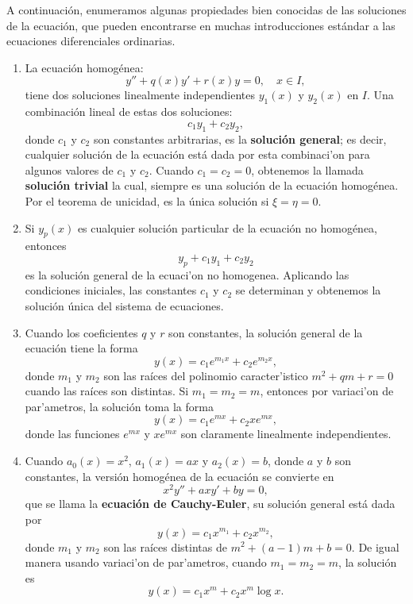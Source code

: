 \documentclass[main.tex]{subfiles}
\begin{document}
A continuación, enumeramos algunas propiedades bien conocidas de las soluciones de la ecuación, que pueden encontrarse en muchas introducciones estándar a las ecuaciones diferenciales ordinarias.

\begin{enumerate}
    \item La ecuación homogénea:
    \[
    y'' + q(x) y' + r(x) y = 0, \quad x \in I,
    \]
    tiene dos soluciones linealmente independientes \( y_1(x) \) y \( y_2(x) \) en \( I \). Una combinación lineal de estas dos soluciones:
    \[
    c_1 y_1 + c_2 y_2,
    \]
    donde \(c_1\) y \(c_2\) son constantes arbitrarias, es la \textbf{solución general}; es decir, cualquier solución de la ecuación está dada por esta combinaci'on para algunos valores de \(c_1\) y \(c_2\). Cuando \(c_1=c_2=0\), obtenemos la llamada \textbf{solución trivial} la cual, siempre es una solución de la ecuación homogénea. Por el teorema de unicidad, es la única solución si \(\xi=\eta=0\).

    \item Si \(y_p(x)\) es cualquier solución particular de la ecuación no homogénea, entonces
    \[
    y_p + c_1 y_1 + c_2 y_2
    \]
    es la solución general de la ecuaci'on no homogenea. Aplicando las condiciones iniciales, las constantes \( c_1 \) y \( c_2 \) se determinan y obtenemos la solución única del sistema de ecuaciones.

    \item Cuando los coeficientes \(q\) y \(r\) son constantes, la solución general de la ecuación tiene la forma
    \[
    y(x)=c_1 e^{m_1 x} + c_2 e^{m_2 x},
    \]
    donde \( m_1 \) y \( m_2 \) son las raíces del polinomio caracter'istico \(m^2+qm+r=0\) cuando las raíces son distintas. Si \( m_1 = m_2 = m \), entonces por variaci'on de par'ametros, la solución toma la forma
    \[
    y(x)=c_1 e^{m x} + c_2 x e^{m x},
    \]
    donde las funciones \( e^{m x} \) y \( x e^{m x} \) son claramente linealmente independientes.

    \item Cuando \(a_0(x)=x^2\), \(a_1(x)=ax\) y \(a_2(x)=b\), donde \(a\) y \(b\) son constantes, la versión homogénea de la ecuación se convierte en
    \[
    x^2 y'' + a x y' + b y = 0,
    \]
    que se llama la \textbf{ecuación de Cauchy-Euler}, su solución general está dada por
    \[
    y(x)=c_1 x^{m_1} + c_2 x^{m_2},
    \]
    donde \(m_1\) y \(m_2\) son las raíces distintas de \(m^2+(a-1)m+b=0\). De igual manera usando variaci'on de par'ametros, cuando \(m_1=m_2=m\), la solución es
    \[
    y(x)=c_1 x^m + c_2 x^m \log x.
    \]


\end{enumerate}
\end{document}
